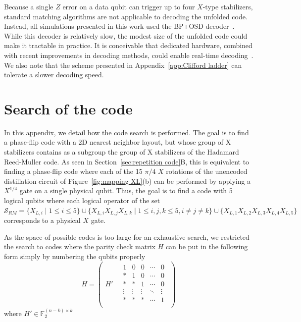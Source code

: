 \documentclass[%
 reprint,
superscriptaddress,
 amsmath,amssymb,
 aps,
]{revtex4-2}
\begin{document}
Because a single $Z$ error on a data qubit can trigger up to four $X$-type stabilizers, standard matching algorithms are not applicable to decoding the unfolded code. Instead, all simulations presented in this work used the BP+OSD decoder~\cite{panteleev2021degenerate, roffe2020decoding, Roffe_LDPC_Python_tools_2022}. While this decoder is relatively slow, the modest size of the unfolded code could make it tractable in practice. It is conceivable that dedicated hardware, combined with recent improvements in decoding methods, could enable real-time decoding~\cite{muller2025improved, koutsioumpas2025automorphism,gong2024toward, ott2025decision, hillmann2024localized, wolanski2024ambiguity}. We also note that the scheme presented in Appendix~\ref{app:Clifford ladder} can tolerate a slower decoding speed.

\section{Search of the code}
\label{app:code search}

In this appendix, we detail how the code search is performed. The goal is to find a phase-flip code with a 2D nearest neighbor layout, but whose group of X stabilizers contains as a subgroup the group of X stabilizers of the Hadamard Reed-Muller code. As seen in Section~\ref{sec:repetition code}B, this is equivalent to finding a phase-flip code where each of the 15 $\pi/4$ $X$ rotations of the unencoded distillation circuit of Figure~\ref{fig:mapping XL}(b) can be performed by applying a $X^{1/4}$ gate on a single physical qubit. Thus, the goal is to find a code with 5 logical qubits where each logical operator of the set $\mathcal S _{RM} = \{ X_{L,i} \mid 1 \le i \le 5 \} \cup \{ X_{L,i} X_{L,j} X_{L,k} \mid 1 \le i, j, k \le 5, i \ne j \ne k \} \cup \{ X_{L,1} X_{L,2} X_{L,3} X_{L,4} X_{L,5} \}$ corresponds to a physical $X$ gate.

As the space of possible codes is too large for an exhaustive search, we restricted the search to codes where the parity check matrix $H$ can be put in the following form simply by numbering the qubits properly
\begin{equation}
H = \left( \begin{array}{c|c}
H'\ & \begin{matrix}
1 & 0 & 0 & \cdots & 0 \\
* & 1 & 0 & \cdots & 0 \\
* & * & 1 & \cdots & 0 \\
\vdots & \vdots & \vdots & \ddots & \vdots \\
* & * & * & \cdots & 1 \\
\end{matrix}
\end{array} \right)
\end{equation}
where $H' \in \mathbb{F}_2^{(n-k) \times k}$
\end{document}
